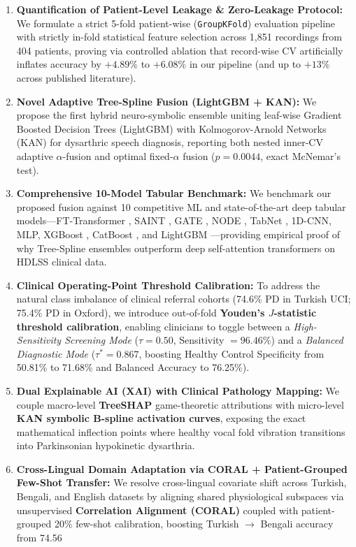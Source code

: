 \documentclass[journal,10pt,twoside]{IEEEtran}
\begin{document}
\begin{enumerate}
    \item \textbf{Quantification of Patient-Level Leakage \& Zero-Leakage Protocol:} We formulate a strict 5-fold patient-wise (\texttt{GroupKFold}) evaluation pipeline with strictly in-fold statistical feature selection across 1,851 recordings from 404 patients, proving via controlled ablation that record-wise CV artificially inflates accuracy by $+4.89\%$ to $+6.08\%$ in our pipeline (and up to $+13\%$ across published literature).
    \item \textbf{Novel Adaptive Tree-Spline Fusion (LightGBM + KAN):} We propose the first hybrid neuro-symbolic ensemble uniting leaf-wise Gradient Boosted Decision Trees (LightGBM) with Kolmogorov-Arnold Networks (KAN) for dysarthric speech diagnosis, reporting both nested inner-CV adaptive $\alpha$-fusion and optimal fixed-$\alpha$ fusion ($p = 0.0044$, exact McNemar's test).
    \item \textbf{Comprehensive 10-Model Tabular Benchmark:} We benchmark our proposed fusion against 10 competitive ML and state-of-the-art deep tabular models---FT-Transformer \cite{ref11}, SAINT \cite{ref14}, GATE \cite{ref15}, NODE \cite{ref13}, TabNet \cite{ref12}, 1D-CNN, MLP, XGBoost \cite{ref9}, CatBoost \cite{ref10}, and LightGBM \cite{ref8}---providing empirical proof of why Tree-Spline ensembles outperform deep self-attention transformers on HDLSS clinical data.
    \item \textbf{Clinical Operating-Point Threshold Calibration:} To address the natural class imbalance of clinical referral cohorts (74.6\% PD in Turkish UCI; 75.4\% PD in Oxford), we introduce out-of-fold \textbf{Youden's $J$-statistic threshold calibration}, enabling clinicians to toggle between a \textit{High-Sensitivity Screening Mode} ($\tau = 0.50$, Sensitivity $= 96.46\%$) and a \textit{Balanced Diagnostic Mode} ($\tau^* = 0.867$, boosting Healthy Control Specificity from 50.81\% to 71.68\% and Balanced Accuracy to 76.25\%).
    \item \textbf{Dual Explainable AI (XAI) with Clinical Pathology Mapping:} We couple macro-level \textbf{TreeSHAP} game-theoretic attributions with micro-level \textbf{KAN symbolic B-spline activation curves}, exposing the exact mathematical inflection points where healthy vocal fold vibration transitions into Parkinsonian hypokinetic dysarthria.
    \item \textbf{Cross-Lingual Domain Adaptation via CORAL + Patient-Grouped Few-Shot Transfer:} We resolve cross-lingual covariate shift across Turkish, Bengali, and English datasets by aligning shared physiological subspaces via unsupervised \textbf{Correlation Alignment (CORAL)} \cite{ref19} coupled with patient-grouped 20\% few-shot calibration, boosting Turkish $\rightarrow$ Bengali accuracy from 74.56%
\end{enumerate}
\end{document}
